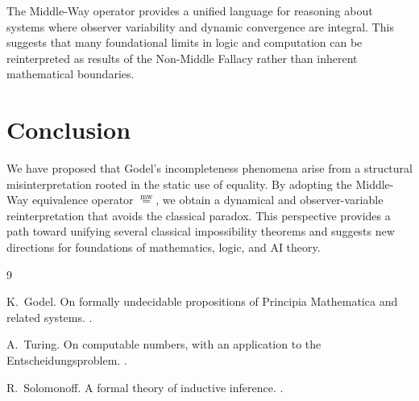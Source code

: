 \documentclass[11pt]{article}
\newcommand{\mweq}{\overset{\mathrm{mw}}{=}}
\begin{document}
The Middle-Way operator provides a unified language for reasoning about 
systems where observer variability and dynamic convergence are integral. 
This suggests that many foundational limits in logic and computation can be 
reinterpreted as results of the Non-Middle Fallacy rather than inherent 
mathematical boundaries.

\section{Conclusion}

We have proposed that Godel's incompleteness phenomena arise from a 
structural misinterpretation rooted in the static use of equality. By 
adopting the Middle-Way equivalence operator $\mweq$, we obtain a 
dynamical and observer-variable reinterpretation that avoids the classical 
paradox. This perspective provides a path toward unifying several classical 
impossibility theorems and suggests new directions for foundations of 
mathematics, logic, and AI theory.


\begin{thebibliography}{9}

K.~Godel.
\newblock On formally undecidable propositions of Principia Mathematica and 
related systems.
.

A.~Turing.
\newblock On computable numbers, with an application to the Entscheidungsproblem.
.

R.~Solomonoff.
\newblock A formal theory of inductive inference.
.

\end{thebibliography}
\end{document}
